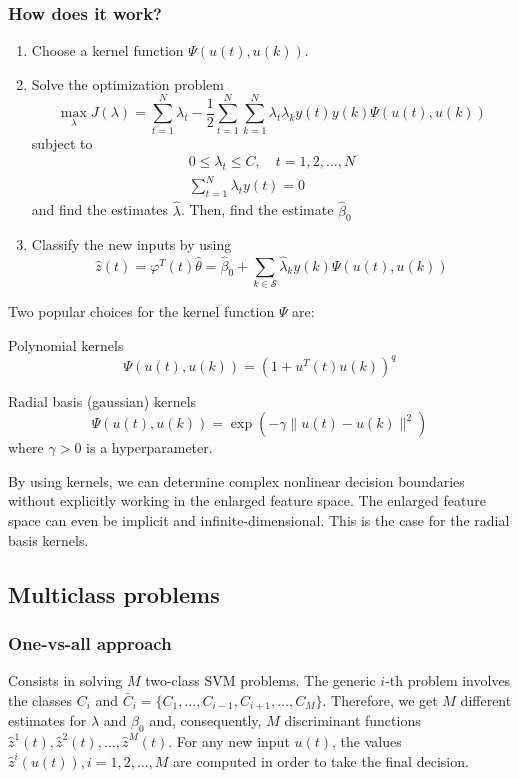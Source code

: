 \documentclass{book}
\theoremstyle{definition}
\theoremstyle{remark}
\theoremstyle{remark}
\begin{document}
\subsubsection{How does it work?}
\begin{enumerate}
  \item Choose a kernel function $\Psi(u(t),u(k))$. 
  \item Solve the optimization problem 
    \[
      \max_\lambda J(\lambda)=\displaystyle\sum_{t=1}^{N}\lambda_t-\displaystyle\frac{1}{2}\displaystyle\sum_{t=1}^{N}\displaystyle\sum_{k=1}^{N}\lambda_t\lambda_k y(t)y(k)\Psi(u(t),u(k))
    \]
    subject to 
    \begin{gather*}
      0\leq\lambda_t\leq C,\quad t=1,2,\dots,N\\
      \displaystyle\sum_{t=1}^{N}\lambda_ty(t)=0
    \end{gather*}
    and find the estimates $\hat{\lambda}$. Then, find the estimate $\hat{\beta}_0$
  \item Classify the new inputs by using
    \[
      \hat{z}(t)=\varphi^T(t)\hat{\theta}=\hat{\beta}_0+\displaystyle\sum_{k\in\mathcal{S}}^{}\hat{\lambda}_ky(k)\Psi(u(t),u(k))
    \]
\end{enumerate}
Two popular choices for the kernel function $\Psi$ are: 

Polynomial kernels 
\[
  \Psi(u(t),u(k))=(1+u^T(t)u(k))^q
\]

Radial basis (gaussian) kernels 
\[
  \Psi(u(t),u(k))=\exp(-\gamma\|u(t)-u(k)\|^2)
\]
where $\gamma>0$ is a hyperparameter. 

By using kernels, we can determine complex nonlinear decision boundaries without explicitly working in the enlarged feature space. The enlarged feature space can even be implicit and infinite-dimensional. This is the case for the radial basis kernels.
\subsection{Multiclass problems}
\subsubsection{One-vs-all approach}
Consists in solving $M$ two-class SVM problems. The generic $i$-th problem involves the classes $C_i$ and $\bar{C}_i=\{C_1,\dots,C_{i-1},C_{i+1},\dots,C_M\}$. Therefore, we get $M$ different estimates for $\lambda$ and $\beta_0$ and, consequently, $M$ discriminant functions $\hat{z}^1(t),\hat{z}^2(t),\dots,\hat{z}^M(t)$. For any new input $u(t)$, the values $\hat{z}^i(u(t)),i=1,2,\dots,M$ are computed in order to take the final decision. 
\end{document}
